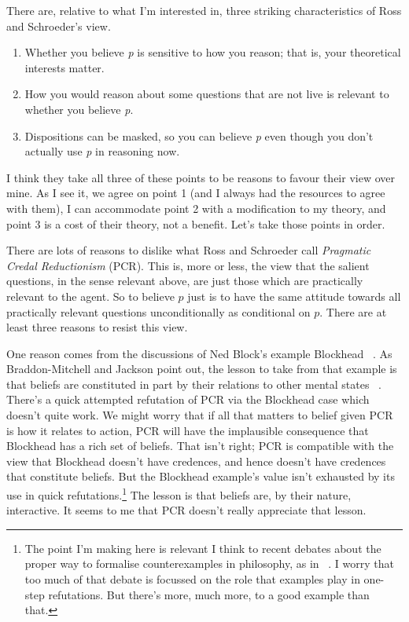 \noindent There are, relative to what I'm interested in, three striking characteristics of Ross and Schroeder's view.

\begin{enumerate}
\item Whether you believe \emph{p} is sensitive to how you reason; that is, your theoretical interests matter.

\item How you would reason about some questions that are not live is relevant to whether you believe \emph{p}.

\item Dispositions can be masked, so you can believe \emph{p} even though you don't actually use \emph{p} in reasoning now.

\end{enumerate}
I think they take all three of these points to be reasons to favour their view over mine. As I see it, we agree on point 1 (and I always had the resources to agree with them), I can accommodate point 2 with a modification to my theory, and point 3 is a cost of their theory, not a benefit. Let's take those points in order.

There are lots of reasons to dislike what Ross and Schroeder call \emph{Pragmatic Credal Reductionism} (PCR). This is, more or less, the view that the salient questions, in the sense relevant above, are just those which are practically relevant to the agent. So to believe $p$ just is to have the same attitude towards all practically relevant questions unconditionally as conditional on $p$. There are at least three reasons to resist this view.

One reason comes from the discussions of Ned Block's example Blockhead ~\citep{Block1978}. As Braddon-Mitchell and Jackson point out, the lesson to take from that example is that beliefs are constituted in part by their relations to other mental states ~\citep[114ff]{DBMJackson2007}. There's a quick attempted refutation of PCR via the Blockhead case which doesn't quite work. We might worry that if all that matters to belief given PCR is how it relates to action, PCR will have the implausible consequence that Blockhead has a rich set of beliefs. That isn't right; PCR is compatible with the view that Blockhead doesn't have credences, and hence doesn't have credences that constitute beliefs. But the Blockhead example's value isn't exhausted by its use in quick refutations.\footnote{The point I'm making here is relevant I think to recent debates about the proper way to formalise counterexamples in philosophy, as in ~\citep{Williamson2007-WILTPO-17, IchikawaJarvis2009, Malmgren2011}. I worry that too much of that debate is focussed on the role that examples play in one-step refutations. But there's more, much more, to a good example than that.} The lesson is that beliefs are, by their nature, interactive. It seems to me that PCR doesn't really appreciate that lesson.

